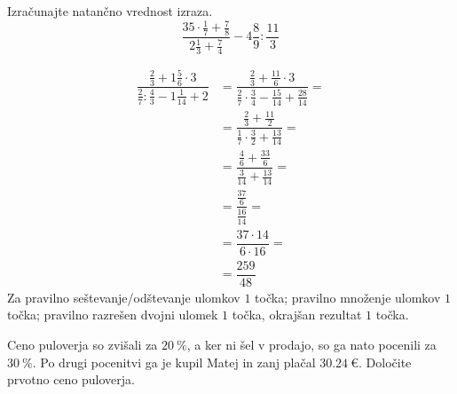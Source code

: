 \documentclass[addpoints]{exam}
\begin{document}
\begin{questions}

    

    \question[4]
    Izračunajte natančno vrednost izraza.
        $$\dfrac{35\cdot \frac{1}{7}+\frac{7}{8}}{2\frac{1}{3}+\frac{7}{4}}-4\frac{8}{9}:\frac{11}{3}$$

        \begin{solution}[9cm]
            \begin{align*} 
                \dfrac{\frac{2}{3}+1\frac{5}{6}\cdot 3}{\frac{2}{7}:\frac{4}{3}-1\frac{1}{14}+2}&=\dfrac{\frac{2}{3}+\frac{11}{6}\cdot 3}{\frac{2}{7}\cdot\frac{3}{4}-\frac{15}{14}+\frac{28}{14}}= \\
                                                                                                &=\dfrac{\frac{2}{3}+\frac{11}{2}}{\frac{1}{7}\cdot\frac{3}{2}+\frac{13}{14}}= \\
                                                                                                &=\dfrac{\frac{4}{6}+\frac{33}{6}}{\frac{3}{14}+\frac{13}{14}}= \\
                                                                                                &=\dfrac{\frac{37}{6}}{\frac{16}{14}}= \\
                                                                                                &=\dfrac{37\cdot 14}{6\cdot 16}= \\
                                                                                                &=\dfrac{259}{48} 
            \end{align*}
            Za pravilno seštevanje/odštevanje ulomkov $1$ točka; pravilno množenje ulomkov $1$ točka; pravilno razrešen dvojni ulomek $1$ točka, okrajšan rezultat $1$ točka.
        \end{solution}




          \question[4]
        Ceno puloverja so zvišali za $20~\%$, a ker ni šel v prodajo, so ga nato pocenili za $30~\%$.
        Po drugi pocenitvi ga je kupil Matej in zanj plačal $30.24~\euro$. Določite prvotno ceno puloverja.



\end{questions}
\end{document}
